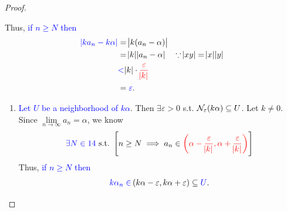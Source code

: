 \documentclass[11pt,openany]{article}
\begin{document}
\begin{note}[]
\begin{proof}
\begin{flushleft}
\begin{minipage}[t]{0.495\textwidth}
\begin{enumerate}[(1)]
\[	\] Thus, \textcolor{blue}{if $n\geq N$ then} \begin{align*}
		\textcolor{blue}{\abs{ka_n-k\alpha}}&=\abs{k(a_n-\alpha)}\\
		&=\abs{k}\abs{a_n-\alpha}\quad\because \abs{xy}=\abs{x}\abs{y}\\
		&\textcolor{blue}{<}\abs{k}\cdot\textcolor{red}{\frac{\varepsilon}{\abs{k}}}\\
		&=\textcolor{blue}{\varepsilon}.
	\end{align*}
\end{enumerate}
\end{minipage}%
\hfill\vline
\begin{minipage}[t]{0.49\textwidth}
\begin{enumerate}[(1)]
	\item \textcolor{blue}{Let $U$ be a neighborhood of $k\alpha$}. Then $\exists\varepsilon>0$ s.t. $\mathcal{N}_{\varepsilon}(k\alpha)\subseteq U$. Let $k\neq 0$. Since $\lim\limits_{n\to\infty}a_n=\alpha$, we know \[
	\textcolor{blue}{\exists N\in\N}\ \text{s.t.}\ \left[n\geq N\implies a_n\in \textcolor{red}{\intoo{\alpha-\frac{\varepsilon}{\abs{k}},\alpha+\frac{\varepsilon}{\abs{k}}}}\right]
	\] Thus, \textcolor{blue}{if $n\geq N$ then} \begin{align*}
		\textcolor{blue}{k\alpha_n\in}\intoo{k\alpha-\varepsilon,k\alpha+\varepsilon}\subseteq \textcolor{blue}{U}.
	\end{align*}
\end{enumerate}
\end{minipage}
\end{flushleft}


\end{proof}
\end{note}
\end{document}
